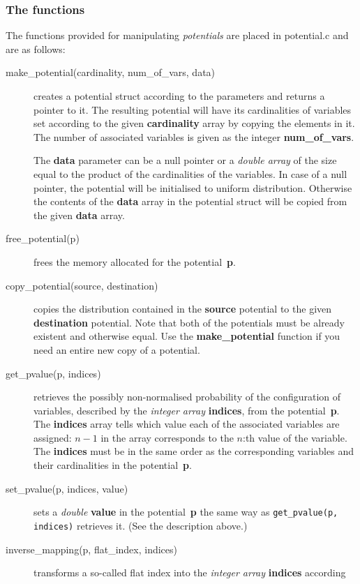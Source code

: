 \documentclass[12pt,a4paper]{report}
\begin{document}
\subsubsection{The functions}
The functions provided for manipulating {\it potentials} are placed in
potential.c and are as follows:
\begin{description}
\item[make\_potential(cardinality, num\_of\_vars, data)] creates a
potential struct according to the parameters and returns a pointer
to it. The resulting potential will have its cardinalities of
variables set according to the given \textbf{cardinality} array by
copying the elements in it. The number of associated variables is
given as the integer \textbf{num\_of\_vars}. 

The \textbf{data} parameter can be a null pointer or a {\it double 
array} of the size equal to the product of the cardinalities of the 
variables. In case of a null pointer, the potential will be
initialised to uniform distribution. Otherwise the contents of 
the \textbf{data} array in the potential struct will be copied from
the given \textbf{data} array.
\item[free\_potential(p)] frees the memory allocated for the
potential~\textbf{p}. 
\item[copy\_potential(source, destination)] copies the distribution
contained in the \textbf{source} potential to the given
\textbf{destination} potential. Note that both of the potentials must
be already existent and otherwise equal. Use the 
\textbf{make\_potential} function if you need an entire new copy of 
a potential.
\item[get\_pvalue(p, indices)] retrieves the possibly non-normalised
probability of the configuration of variables, described by the 
{\it integer array} \textbf{indices}, from the potential~\textbf{p}. 
The \textbf{indices} array tells which value each of the associated
variables are assigned: $n-1$ in the array corresponds to the $n$:th 
value of the variable. The \textbf{indices} must be in the same order
as the corresponding variables and their cardinalities in the
potential~\textbf{p}. 
\item[set\_pvalue(p, indices, value)] sets a {\it double}
\textbf{value} in the potential~\textbf{p} the same way as 
\verb+get_pvalue(p, indices)+ retrieves it. (See the description above.)
\item[inverse\_mapping(p, flat\_index, indices)] transforms a
so-called flat index into the {\it integer array} \textbf{indices} according 

\end{description}
\end{document}
